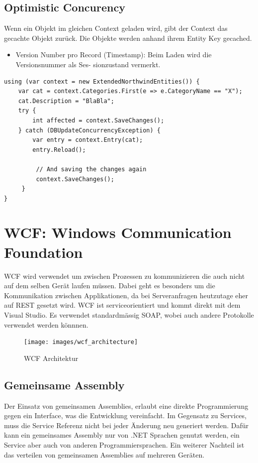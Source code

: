 \subsection{Optimistic Concurency}
Wenn ein Objekt im gleichen Context geladen wird, gibt der Context das gecachte Objekt zurück.
Die Objekte werden anhand ihrem Entity Key gecached.
\begin{itemize}
	\item Version Number pro Record (Timestamp): Beim Laden wird die Versionsnummer als Ses-
	sionzustand vermerkt.
\end{itemize}

\begin{lstlisting}
using (var context = new ExtendedNorthwindEntities()) {
	var cat = context.Categories.First(e => e.CategoryName == "X");
	cat.Description = "BlaBla";
	try {
		int affected = context.SaveChanges();
	} catch (DBUpdateConcurrencyException) {
		var entry = context.Entry(cat);
		entry.Reload();
	
		 // And saving the changes again
		 context.SaveChanges();
	 }
}
\end{lstlisting}

\section{WCF: Windows Communication Foundation}
WCF wird verwendet um zwischen Prozessen zu kommunizieren die auch nicht auf dem selben Gerät laufen müssen. Dabei geht es besonders um die Kommunikation zwischen Applikationen, da bei Serveranfragen heutzutage eher auf REST gesetzt wird. WCF ist serviceorientiert und kommt direkt mit dem Visual Studio. Es verwendet standardmässig SOAP, wobei auch andere Protokolle verwendet werden könnnen. 

\begin{figure}[h]
\centering
\texttt{[image: images/wcf\_architecture]}
\caption{WCF Architektur}
\label{fig:wcfarchitecture}
\end{figure}

\subsection{Gemeinsame Assembly}
Der Einsatz von gemeinsamen Assemblies, erlaubt eine direkte Programmierung gegen ein Interface, was die Entwicklung vereinfacht. Im Gegensatz zu Services, muss die Service Referenz nicht bei jeder Änderung neu generiert werden. Dafür kann ein gemeinsames Assembly nur von .NET Sprachen genutzt werden, ein Service aber auch von anderen Programmiersprachen. Ein weiterer Nachteil ist das verteilen von gemeinsamen Assemblies auf mehreren Geräten.

